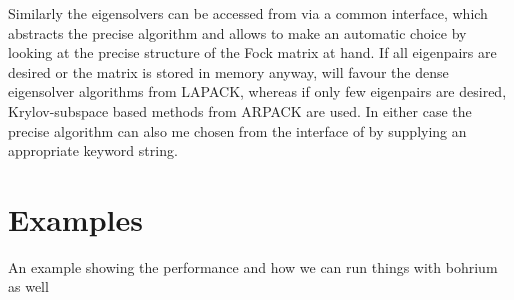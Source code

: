 Similarly the eigensolvers can be accessed from \gscf via a common interface,
which abstracts the precise algorithm and allows \lazyten to make an automatic
choice by looking at the precise structure of the Fock matrix at hand.
If all eigenpairs are desired or the matrix is stored in memory anyway,
\lazyten will favour the dense eigensolver algorithms from LAPACK,
whereas if only few eigenpairs are desired,
Krylov-subspace based methods from ARPACK are used.
In either case the precise algorithm can also me chosen from the \python interface
of \molsturm by supplying an appropriate keyword string.


\section{Examples}
An example showing the performance and how we can run things with bohrium as well

